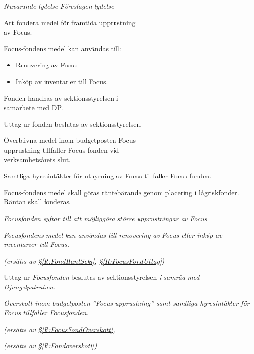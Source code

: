 \documentclass{article}
\newenvironment{lydelse}
    {\begin{paracol}{2}%
        \emph{Nuvarande lydelse}%
        \switchcolumn%
        \emph{Föreslagen lydelse}%
    \end{paracol}%
    \begin{enumerate}[label=\thesubsection.\arabic*]%
    \begin{paracol}{2}%
    }{\end{paracol}\end{enumerate}}
\begin{document}
\begin{lydelse}
    
    \item Att fondera medel för framtida upprustning \\ av Focus.

	\item Focus-fondens medel kan användas till:
	\begin{itemize}
		\item Renovering av Focus
		\item Inköp av inventarier till Focus.
	\end{itemize}

	\item Fonden handhas av sektionsstyrelsen i \\ samarbete med DP.

	\item Uttag ur fonden beslutas av sektionsstyrelsen.

    \vspace{2.75ex}
	\item Överblivna medel inom budgetposten Focus \\ upprustning tillfaller Focus-fonden vid \\ verksamhetsårets slut.

	\item Samtliga hyresintäkter för uthyrning av Focus tillfaller Focus-fonden.

	\item Focus-fondens medel skall göras räntebärande genom placering i lågriskfonder. Räntan skall fonderas.
    
    \switchcolumn
    \setcounter{enumi}{9}
    
    \item \emph{Focusfonden syftar till att möjliggöra större upprustningar av Focus.}
    
    \item \emph{Focusfondens medel kan användas till renovering av Focus eller inköp av inventarier till Focus.}
    
    \vspace{6ex}
    \item[] \emph{(ersätts av \S\ref{R:FondHantSekt}, \S\ref{R:FocusFondUttag})}
    
    \vspace{2.5ex}
    \item Uttag ur \emph{Focusfonden} beslutas av sektionsstyrelsen \emph{i samråd med Djungelpatrullen}.
    \label{R:FocusFondUttag}
    
    \item \emph{Överskott inom budgetposten ''Focus upprustning'' samt samtliga hyresintäkter för Focus tillfaller Focusfonden.}
    \label{R:FocusFondOverskott}
    
    \item[] \emph{(ersätts av \S\ref{R:FocusFondOverskott})}
    
    \vspace{3ex}
    \item[] \emph{(ersätts av \S\ref{R:Fondoverskott})}

\end{lydelse}
\end{document}
